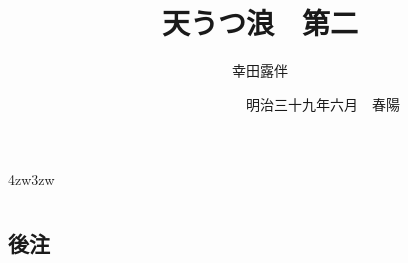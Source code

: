 \documentclass[
uplatex                                     ,%
dvipdfmx                                    ,%
book                                        ,%
tate                                        ,%
twoside                                     ,%
paper                       = a5paper       ,%
open_bracket_pos            = nibu_tentsuki ,%
hanging_punctuation                         ,%
openany                                     ,%
jafontsize                  = 12pt          ,%
]{jlreq}
\title{\Huge 天うつ浪　{\Large 第二}}
\author{幸田露伴}
\date{　　　　　　　　　{\small 明治三十九年六月}　春陽{\換字{堂}}}
\begin{document}
\maketitle
\pagestyle{myheadings}
\newcommand{\Entry}[1]{
	\section*{#1}
	\markboth{#1}{#1}
	\setcounter{equation}{0}}
\begin{indentation}{4zw}{3zw}
\parindent=0pt

\chapter*{}





















































\end{indentation}

\section*{後注}
\theendnotes
\end{document}
